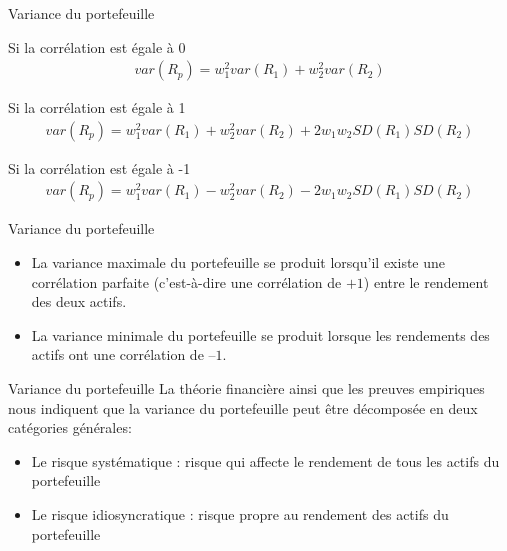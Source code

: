 \documentclass[10pt,a4paper]{beamer}
\begin{document}
\begin{frame}{Variance du portefeuille}
\begin{block}{Si la corrélation est égale à 0}
\begin{align*}
var(R_p) = w_1^2 var(R_1) + w_2^2 var(R_2) 
\end{align*}
\end{block}
\begin{block}{Si la corrélation est égale à 1}
\begin{align*}
var(R_p) = w_1^2 var(R_1) + w_2^2 var(R_2) + 2 w_1 w_2 SD(R_1)SD(R_2)
\end{align*}
\end{block}
\begin{block}{Si la corrélation est égale à -1}
\begin{align*}
var(R_p) = w_1^2 var(R_1) - w_2^2 var(R_2) - 2 w_1 w_2 SD(R_1)SD(R_2)
\end{align*}
\end{block}

\end{frame}

\begin{frame}{Variance du portefeuille}
\begin{itemize}[label=\bullet]
\item La variance maximale du portefeuille se produit lorsqu'il existe une corrélation parfaite (c'est-à-dire une corrélation de $+1$) entre le rendement des deux actifs.
\item La variance minimale du portefeuille se produit lorsque les rendements des actifs ont une corrélation de $–1$.
\end{itemize}

\end{frame}


\begin{frame}{Variance du portefeuille}
La théorie financière ainsi que les preuves empiriques nous indiquent que la variance du portefeuille peut être décomposée en deux catégories générales:
\begin{itemize}[label=\bullet]
\item Le risque systématique : risque qui affecte le rendement de tous les actifs du portefeuille
\item Le risque idiosyncratique : risque propre au rendement des actifs du portefeuille
\end{itemize}
\end{frame}
\end{document}

